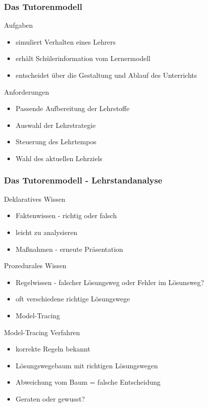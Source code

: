 \documentclass{beamer}
\begin{document}
\begin{frame}
  \frametitle{Das Tutorenmodell}

  \begin{block}{Aufgaben}
    \begin{itemize}
      \item simuliert Verhalten eines Lehrers
      \item erhält Schülerinformation vom Lernermodell
      \item entscheidet über die Gestaltung und Ablauf des Unterrichts
    \end{itemize}
  \end{block}

  \begin{block}{Anforderungen}
    \begin{itemize}
      \item Passende Aufbereitung der Lehrstoffe
      \item Auswahl der Lehrstrategie
      \item Steuerung des Lehrtempos
      \item Wahl des aktuellen Lehrziels
    \end{itemize}
  \end{block}
\end{frame}

\begin{frame}
  \frametitle{Das Tutorenmodell - Lehrstandanalyse}
  \begin{block}{Deklaratives Wissen}
    \begin{itemize}
      \item Faktenwissen - richtig oder falsch
      \item leicht zu analysieren
      \item Maßnahmen - erneute Präsentation
    \end{itemize}
  \end{block}

  \begin{block}{Prozedurales Wissen}
    \begin{itemize}
      \item Regelwissen - falscher Lösungsweg oder Fehler im Lösunsweg?
      \item oft verschiedene richtige Lösungswege
      \item Model-Tracing
    \end{itemize}
  \end{block}

  \begin{block}{Model-Tracing Verfahren}
    \begin{itemize}
      \item korrekte Regeln bekannt
      \item Lösungswegebaum mit richtigen Lösungswegen
      \item Abweichung vom Baum = falsche Entscheidung
      \item Geraten oder gewusst?
    \end{itemize}
  \end{block}
\end{frame}
\end{document}
